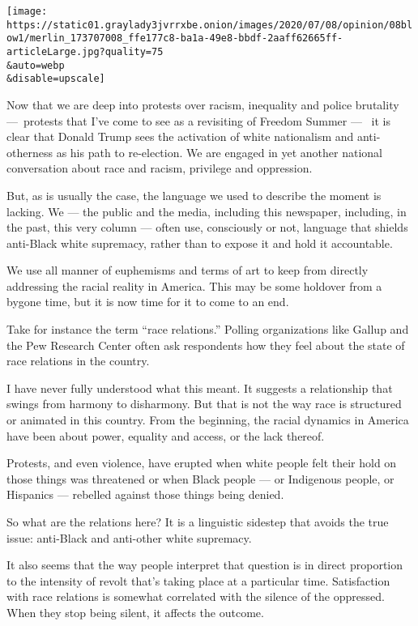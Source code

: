 \texttt{[image: https://static01.graylady3jvrrxbe.onion/images/2020/07/08/opinion/08blow1/merlin\_173707008\_ffe177c8-ba1a-49e8-bbdf-2aaff62665ff-articleLarge.jpg?quality=75\\\&auto=webp\\\&disable=upscale]}

Now that we are deep into protests over racism, inequality and police
brutality ---~protests that I've come to see as a revisiting of Freedom
Summer ---~ it is clear that Donald Trump sees the activation of white
nationalism and anti-otherness as his path to re-election. We are
engaged in yet another national conversation about race and racism,
privilege and oppression.

But, as is usually the case, the language we used to describe the moment
is lacking. We --- the public and the media, including this newspaper,
including, in the past, this very column --- often use, consciously or
not, language that shields anti-Black white supremacy, rather than to
expose it and hold it accountable.

We use all manner of euphemisms and terms of art to keep from directly
addressing the racial reality in America. This may be some holdover from
a bygone time, but it is now time for it to come to an end.

Take for instance the term ``race relations.'' Polling organizations
like Gallup and the Pew Research Center often ask respondents how they
feel about the state of race relations in the country.

I have never fully understood what this meant. It suggests a
relationship that swings from harmony to disharmony. But that is not the
way race is structured or animated in this country. From the beginning,
the racial dynamics in America have been about power, equality and
access, or the lack thereof.

Protests, and even violence, have erupted when white people felt their
hold on those things was threatened or when Black people --- or
Indigenous people, or Hispanics --- rebelled against those things being
denied.

So what are the relations here? It is a linguistic sidestep that avoids
the true issue: anti-Black and anti-other white supremacy.

It also seems that the way people interpret that question is in direct
proportion to the intensity of revolt that's taking place at a
particular time. Satisfaction with race relations is somewhat correlated
with the silence of the oppressed. When they stop being silent, it
affects the outcome.

